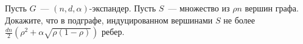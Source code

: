 Пусть $G$~--- $(n, d, \alpha)$-экспандер. Пусть $S$~--- множество из $\rho n$ вершин графа. Докажите, что
в подграфе, индуцированном вершинами $S$ не более $\frac{dn}{2} (\rho^2 + \alpha \sqrt{\rho (1 - \rho)})$
ребер.
